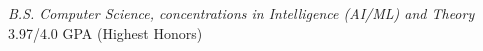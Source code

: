 \documentclass{article}
\begin{document}
\begin{flushleft}






{\textit{B.S. Computer Science, concentrations in Intelligence (AI/ML) and Theory} \hfill 3.97/4.0 GPA (Highest Honors)
    \\
}



\end{flushleft}
\end{document}
